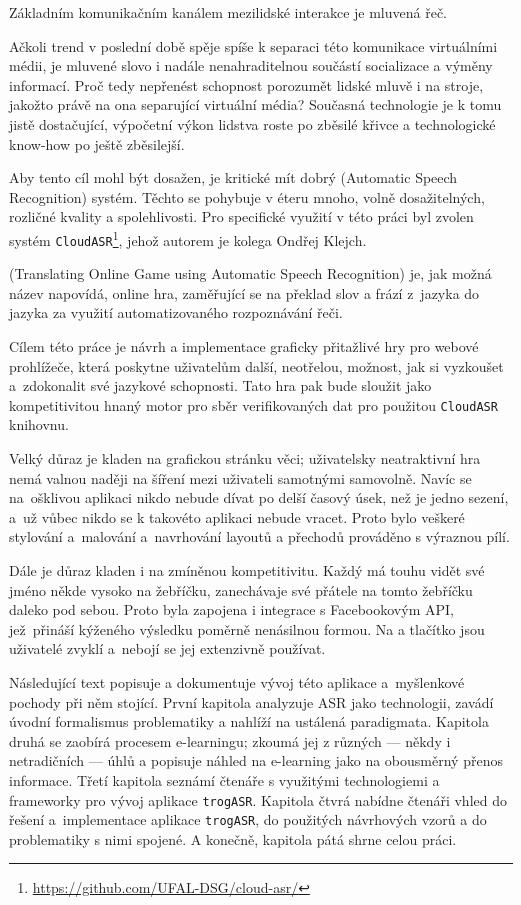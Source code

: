 
Základním komunikačním kanálem mezilidské interakce je mluvená řeč. 

Ačkoli trend v poslední době spěje spíše k separaci této komunikace virtuálními médii, je mluvené slovo i nadále nenahraditelnou součástí socializace a výměny informací. Proč tedy nepřenést schopnost porozumět lidské mluvě i na stroje, jakožto právě na ona separující virtuální média? Současná technologie je k tomu jistě dostačující, výpočetní výkon lidstva roste po zběsilé křivce a technologické know-how po ještě zběsilejší.

Aby tento cíl mohl být dosažen, je kritické mít dobrý  (Automatic Speech Recognition) systém. Těchto se pohybuje v éteru mnoho, volně dosažitelných, rozličné kvality a spolehlivosti. Pro specifické využití v této práci byl zvolen systém 
\verb|CloudASR|\footnote{\url{https://github.com/UFAL-DSG/cloud-asr/}}, jehož autorem je kolega Ondřej Klejch.

\texttt{} (Translating Online Game using Automatic Speech Recognition) je, jak možná název napovídá, online hra, zaměřující se na překlad slov a frází z~jazyka do jazyka za využití automatizovaného rozpoznávání řeči.

Cílem této práce je návrh a implementace graficky přitažlivé hry pro webové prohlížeče, která poskytne uživatelům další, neotřelou, možnost, jak si vyzkoušet a~zdokonalit své jazykové schopnosti. Tato hra pak bude sloužit jako kompetitivitou hnaný motor pro sběr verifikovaných dat pro použitou \verb|CloudASR| knihovnu.

Velký důraz je kladen na grafickou stránku věci; uživatelsky neatraktivní hra nemá valnou naději na šíření mezi uživateli samotnými samovolně. Navíc se na~ošklivou aplikaci nikdo nebude dívat po delší časový úsek, než je jedno sezení, a~už vůbec nikdo se k takovéto aplikaci nebude vracet. Proto bylo veškeré stylování a~malování a~navrhování layoutů a přechodů prováděno s výraznou pílí.

Dále je důraz kladen i na zmíněnou kompetitivitu. Každý má touhu vidět své jméno někde vysoko na žebříčku, zanechávaje své přátele na tomto žebříčku daleko pod sebou. Proto byla zapojena i integrace s Facebookovým API, jež~přináší kýženého výsledku poměrně nenásilnou formou. Na  a  tlačítko jsou uživatelé zvyklí a~nebojí se jej extenzivně používat.

Následující text popisuje a dokumentuje vývoj této aplikace a~myšlenkové pochody při něm stojící. První kapitola analyzuje ASR jako technologii, zavádí úvodní formalismus problematiky a nahlíží na ustálená paradigmata. Kapitola druhá se zaobírá procesem e-learningu; zkoumá jej z různých --- někdy i netradičních --- úhlů a popisuje náhled na e-learning jako na obousměrný přenos informace. Třetí kapitola seznámí čtenáře s využitými technologiemi a frameworky pro vývoj aplikace \verb|trogASR|. Kapitola čtvrá nabídne čtenáři vhled do řešení a~implementace aplikace \verb|trogASR|, do použitých návrhových vzorů a do problematiky s nimi spojené. A konečně, kapitola pátá shrne celou práci.